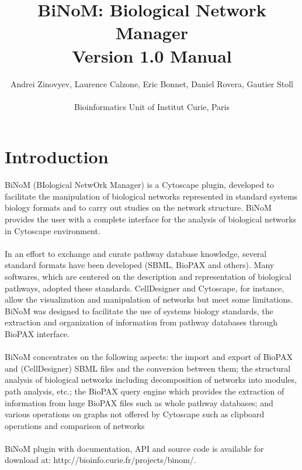 \documentclass[11pt]{article}
\begin{document}
\title{\huge{BiNoM: Biological Network Manager \\ Version 1.0 Manual}}
\author{ Andrei Zinovyev, Laurence Calzone, Eric Bonnet, Daniel
Rovera, Gautier Stoll \\ \\ Bioinformatics Unit of Institut Curie, Paris}
\maketitle
\tableofcontents
\newpage
\section{Introduction}
BiNoM (BIological NetwOrk Manager) is a Cytoscape plugin, developed to facilitate the manipulation of biological networks represented in standard systems biology formats and to carry out studies on the network structure. BiNoM provides the user with a complete interface for the analysis of biological networks in Cytoscape environment.\\\\
In an effort to exchange and curate pathway database knowledge, several standard formats have been developed (SBML, BioPAX \cite{stromback2005representation} and others). Many softwares, which are centered on the description and representation of biological pathways, adopted these standards. CellDesigner\cite{kitano2005using} and Cytoscape\cite{shannon2003cytoscape}, for instance, allow the visualization and manipulation of networks but meet some limitations. BiNoM was designed to facilitate the use of systems biology standards, the extraction and organization of information from pathway databases through BioPAX interface.\\\\
BiNoM concentrates on the following aspects: the import and export of BioPAX and (CellDesigner) SBML files and the conversion between them; the structural analysis of biological networks including decomposition of networks into modules, path analysis, etc.; the BioPAX query engine which provides the extraction of information from huge BioPAX files such as whole pathway databases; and various operations on graphs not offered by Cytoscape such as clipboard operations and comparison of networks\\\\
BiNoM plugin with documentation, API and source code is available for download at: http://bioinfo.curie.fr/projects/binom/.\\\\
\end{document}
